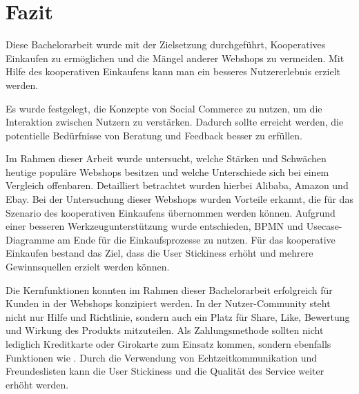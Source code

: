 
\chapter{Fazit}

Diese Bachelorarbeit wurde mit der Zielsetzung durchgeführt, Kooperatives Einkaufen zu ermöglichen und die Mängel anderer Webshops zu vermeiden. Mit Hilfe des kooperativen Einkaufens kann man ein besseres Nutzererlebnis erzielt werden.

Es wurde festgelegt, die Konzepte von Social Commerce zu nutzen, um die Interaktion zwischen Nutzern zu verstärken. Dadurch sollte erreicht werden, die potentielle Bedürfnisse von Beratung und Feedback besser zu erfüllen.

Im Rahmen dieser Arbeit wurde untersucht, welche Stärken und Schwächen heutige populäre Webshops besitzen und welche Unterschiede sich bei einem Vergleich offenbaren. Detailliert betrachtet wurden hierbei Alibaba, Amazon und Ebay. Bei der Untersuchung dieser Webshops wurden Vorteile erkannt, die für das Szenario des kooperativen Einkaufens übernommen werden können. Aufgrund einer besseren Werkzeugunterstützung wurde entschieden, BPMN und Usecase-Diagramme am Ende für die Einkaufsprozesse zu nutzen. Für das kooperative Einkaufen bestand das Ziel, dass die User Stickiness erhöht und mehrere Gewinnsquellen erzielt werden können.

Die Kernfunktionen konnten im Rahmen dieser Bachelorarbeit erfolgreich für Kunden in der Webshops konzipiert werden. In der Nutzer-Community steht nicht nur Hilfe und Richtlinie, sondern auch ein Platz für Share, Like, Bewertung und Wirkung des Produkts mitzuteilen. Als Zahlungsmethode sollten nicht lediglich Kreditkarte oder Girokarte zum Einsatz kommen, sondern ebenfalls Funktionen wie . Durch die Verwendung von Echtzeitkommunikation und Freundeslisten kann die User Stickiness und die Qualität des Service weiter erhöht werden.
